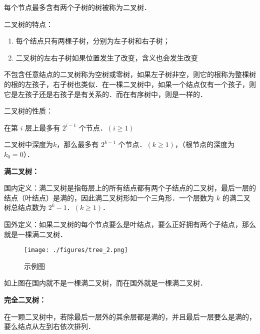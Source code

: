 
每个节点最多含有两个子树的树被称为二叉树．

二叉树的特点：

\begin{enumerate}
\item 每个结点只有两棵子树，分别为左子树和右子树；
\item 二叉树的左右子树如果位置发生了改变，含义也会发生改变
\end{enumerate}

不包含任意结点的二叉树称为空树或零树，如果左子树非空，则它的根称为整棵树的根的左孩子，右子树也类似．在一棵二叉树中，如果一个结点仅有一个孩子，则它是左孩子还是右孩子是有关系的．而在有序树中，则是一样的．

二叉树的性质：

在第 $i$ 层上最多有 $2 ^ {i - 1}$ 个节点．$(i\geq1)$

二叉树中深度为$k$，那么最多有 $2 ^ {k - 1}$ 个节点．$(k\geq1)$，（根节点的深度为 $k_0 = 0$）．

\textbf{满二叉树：}

国内定义：满二叉树是指每层上的所有结点都有两个子结点的二叉树，最后一层的结点（叶结点）是满的，因此满二叉树形如一个三角形．一个层数为 $k$ 的满二叉树总结点数为 $2^k - 1$．$(k\geq1)$．

国外定义：如果二叉树的每个节点要么是叶结点，要么正好拥有两个子结点，那么就是一棵满二叉树．

\begin{figure}[ht]
\centering
\texttt{[image: ./figures/tree\_2.png]}
\caption{示例图} \label{tree_fig2}
\end{figure}

如上图在国内就不是一棵满二叉树，而在国外就是一棵满二叉树．

\textbf{完全二叉树：}

在一颗二叉树中，若除最后一层外的其余层都是满的，并且最后一层要么是满的，要么结点从左到右依次排列．


